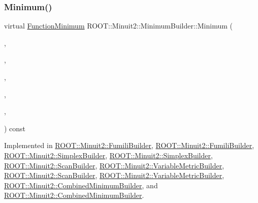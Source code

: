 \subsubsection{\texorpdfstring{Minimum()}{Minimum()}\hspace{0.1cm}{\footnotesize\ttfamily [2/2]}}
{\footnotesize\ttfamily virtual \mbox{\hyperlink{classROOT_1_1Minuit2_1_1FunctionMinimum}{Function\+Minimum}} R\+O\+O\+T\+::\+Minuit2\+::\+Minimum\+Builder\+::\+Minimum (\begin{DoxyParamCaption}\item[{const \mbox{\hyperlink{classROOT_1_1Minuit2_1_1MnFcn}{Mn\+Fcn}} \&}]{,  }\item[{const \mbox{\hyperlink{classROOT_1_1Minuit2_1_1GradientCalculator}{Gradient\+Calculator}} \&}]{,  }\item[{const \mbox{\hyperlink{classROOT_1_1Minuit2_1_1MinimumSeed}{Minimum\+Seed}} \&}]{,  }\item[{const \mbox{\hyperlink{classROOT_1_1Minuit2_1_1MnStrategy}{Mn\+Strategy}} \&}]{,  }\item[{unsigned int}]{,  }\item[{double}]{ }\end{DoxyParamCaption}) const\hspace{0.3cm}{\ttfamily [pure virtual]}}



Implemented in \mbox{\hyperlink{classROOT_1_1Minuit2_1_1FumiliBuilder_a6e598ea8d57750ec860595ba494bb501}{R\+O\+O\+T\+::\+Minuit2\+::\+Fumili\+Builder}}, \mbox{\hyperlink{classROOT_1_1Minuit2_1_1FumiliBuilder_aa1889039835b4117cb2a9b7d49e4f6dd}{R\+O\+O\+T\+::\+Minuit2\+::\+Fumili\+Builder}}, \mbox{\hyperlink{classROOT_1_1Minuit2_1_1SimplexBuilder_a82c52765929e3f4a41b1abe1473d4140}{R\+O\+O\+T\+::\+Minuit2\+::\+Simplex\+Builder}}, \mbox{\hyperlink{classROOT_1_1Minuit2_1_1SimplexBuilder_a68ea5d16ee89941e9674eb673dbde593}{R\+O\+O\+T\+::\+Minuit2\+::\+Simplex\+Builder}}, \mbox{\hyperlink{classROOT_1_1Minuit2_1_1ScanBuilder_ad53e9711dc8a63958845ac6e6eb5250f}{R\+O\+O\+T\+::\+Minuit2\+::\+Scan\+Builder}}, \mbox{\hyperlink{classROOT_1_1Minuit2_1_1VariableMetricBuilder_a56d18a37b8643611ff80875b91915784}{R\+O\+O\+T\+::\+Minuit2\+::\+Variable\+Metric\+Builder}}, \mbox{\hyperlink{classROOT_1_1Minuit2_1_1ScanBuilder_a24547691823b9f0977e6b23b6d084e7a}{R\+O\+O\+T\+::\+Minuit2\+::\+Scan\+Builder}}, \mbox{\hyperlink{classROOT_1_1Minuit2_1_1VariableMetricBuilder_af39ef2e38ec2bf3d94fa78fe0ed9a64a}{R\+O\+O\+T\+::\+Minuit2\+::\+Variable\+Metric\+Builder}}, \mbox{\hyperlink{classROOT_1_1Minuit2_1_1CombinedMinimumBuilder_a44282b6271b536b7fc6b80af16ac67ef}{R\+O\+O\+T\+::\+Minuit2\+::\+Combined\+Minimum\+Builder}}, and \mbox{\hyperlink{classROOT_1_1Minuit2_1_1CombinedMinimumBuilder_a5439a04b01ff94a8f790443b867d6e53}{R\+O\+O\+T\+::\+Minuit2\+::\+Combined\+Minimum\+Builder}}.



